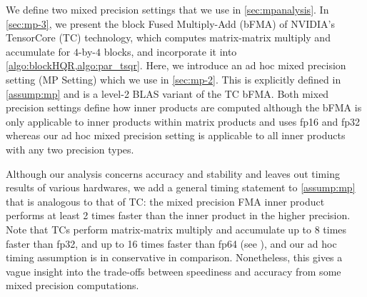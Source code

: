 \documentclass[review,onefignum,onetabnum]{siamart190516}
\begin{document}
We define two mixed precision settings that we use in \cref{sec:mpanalysis}.
In \cref{sec:mp-3}, we present the block Fused Multiply-Add (bFMA) of NVIDIA's TensorCore (TC) technology, which computes matrix-matrix multiply and accumulate for $4$-by-$4$ blocks, and incorporate it into \cref{algo:blockHQR,algo:par_tsqr}.
Here, we introduce an ad hoc mixed precision setting (MP Setting) which we use in \cref{sec:mp-2}.
This is explicitly defined in \cref{assump:mp} and is a level-2 BLAS variant of the TC bFMA. 
Both mixed precision settings define how inner products are computed although the bFMA is only applicable to inner products within matrix products and uses fp16 and fp32 whereas our 
ad hoc mixed precision setting is applicable to all inner products with any two precision types.\par  

Although our analysis concerns accuracy and stability and leaves out timing results of various hardwares, we add a general timing statement to \cref{assump:mp} that is analogous to that of TC: the mixed precision FMA inner product performs at least 2 times faster than the inner product in the higher precision.
Note that TCs perform matrix-matrix multiply and accumulate up to 8 times faster than fp32, and up to 16 times faster than fp64 (see ), and our ad hoc timing assumption is in conservative in comparison. 
Nonetheless, this gives a vague insight into the trade-offs between speediness and accuracy from some mixed precision computations.  
\end{document}
